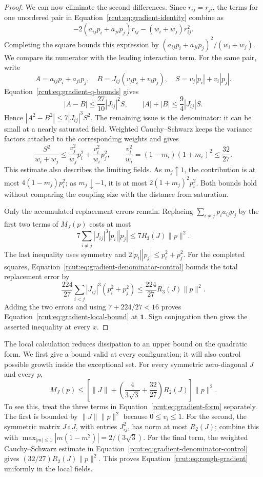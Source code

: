 \begin{proof}
We can now eliminate the second differences.  Since $r_{ij}=r_{ji}$,
the terms for one unordered pair in
Equation~\eqref{rcut:eq:gradient-identity} combine as
\[
 -2(a_{ij}p_i+a_{ji}p_j)r_{ij}-(w_i+w_j)r_{ij}^2.
\]
Completing the square bounds this expression by
$(a_{ij}p_i+a_{ji}p_j)^2/(w_i+w_j)$.
We compare its numerator with the leading interaction term.  For the
same pair, write
\[
 A=a_{ij}p_i+a_{ji}p_j,\quad
 B=J_{ij}(v_jp_i+v_ip_j),\quad
 S=v_j|p_i|+v_i|p_j|.
\]
Equation~\eqref{rcut:eq:gradient-q-bounds} gives
\[
 |A-B|\le\frac{27}{10}|J_{ij}|^2S,
 \qquad |A|+|B|\le\frac94|J_{ij}|S.
\]
Hence $|A^2-B^2|\le7|J_{ij}|^3S^2$.
The remaining issue is the denominator: it can be small at a nearly
saturated field.  Weighted Cauchy--Schwarz keeps the variance factors
attached to the corresponding weights and gives
\begin{equation}
 \frac{S^2}{w_i+w_j}
 \le\frac{v_j^2}{w_j}p_i^2+\frac{v_i^2}{w_i}p_j^2,
 \qquad
 \frac{v_i^2}{w_i}=(1-m_i)(1+m_i)^2\le\frac{32}{27}.
\label{rcut:eq:gradient-denominator-control}
\end{equation}
This estimate also describes the limiting fields.  As $m_j\uparrow1$,
the contribution is at most $4(1-m_j)p_i^2$; as $m_j\downarrow-1$,
it is at most $2(1+m_j)^2p_i^2$.  Both bounds hold without comparing
the coupling size with the distance from saturation.

Only the accumulated replacement errors remain.  Replacing
$\sum_{i\ne j}p_i a_{ij}p_j$ by the first two terms of $M_J(p)$
costs at most
\[
 7\sum_{i\ne j}|J_{ij}|^3|p_i||p_j|
 \le7R_3(J)\|p\|^2.
\]
The last inequality uses symmetry and $2|p_i||p_j|\le p_i^2+p_j^2$.
For the completed squares,
Equation~\eqref{rcut:eq:gradient-denominator-control} bounds the total
replacement error by
\[
 \frac{224}{27}\sum_{i<j}|J_{ij}|^3(p_i^2+p_j^2)
 \le\frac{224}{27}R_3(J)\|p\|^2.
\]
Adding the two errors and using $7+224/27<16$ proves
Equation~\eqref{rcut:eq:gradient-local-bound} at $\mathbf 1$.
Sign conjugation then gives the asserted inequality at every $x$.
\end{proof}

The local calculation reduces dissipation to an upper bound on the
quadratic form.  We first give a bound valid at every configuration; it
will also control possible growth inside the exceptional set.
For every symmetric zero-diagonal $J$ and every $p$,
\begin{equation}
 M_J(p)\le
 \left[\|J\|+
       \left(\frac{4}{3\sqrt3}+\frac{32}{27}\right)R_2(J)
 \right]\|p\|^2.
\label{rcut:eq:rough-gradient}
\end{equation}
To see this, treat the three terms in
Equation~\eqref{rcut:eq:gradient-form} separately.  The first is bounded
by $\|J\|\|p\|^2$ because $0\le v_i\le1$.
For the second, the symmetric matrix $J\circ J$, with entries
$J_{ij}^2$, has norm at most $R_2(J)$; combine this with
$\max_{|m|\le1}|m(1-m^2)|=2/(3\sqrt3)$.
For the final term, the weighted Cauchy--Schwarz estimate in
Equation~\eqref{rcut:eq:gradient-denominator-control} gives
$(32/27)R_2(J)\|p\|^2$.  This proves
Equation~\eqref{rcut:eq:rough-gradient} uniformly in the local fields.

